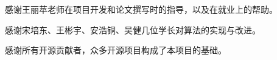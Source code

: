 \begin{acknowledgement}

    感谢王丽苹老师在项目开发和论文撰写时的指导，以及在就业上的帮助。

    感谢宋培东、王彬宇、安浩铜、吴健几位学长对算法的实现与改进。

    感谢所有开源贡献者，众多开源项目构成了本项目的基础。

\end{acknowledgement}

